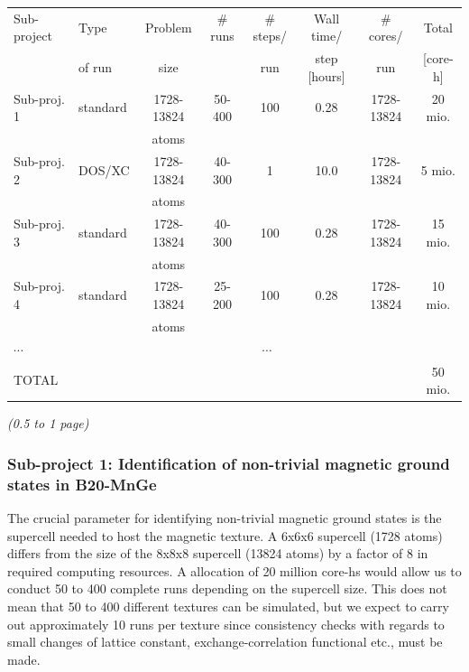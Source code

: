 \documentclass [a4paper, 12pt]{article}
\begin{document}
\begin{tabular}{llcccccc} \hline\hline
  Sub-project & 
  Type &
  Problem & 
  \# runs & 
  \# steps/ & 
  Wall time/ & 
  \# cores/ & 
  Total \\
  &
  of run &
  size  &
  &
  run &
  step [hours] &
  run &
  [core-h] \\
 \hline\hline
  Sub-proj. 1 & 
  standard &
  1728-13824 & 
  50-400 & 
  100 &
  0.28 &
  1728-13824 &
  20 mio. \\
     &
     &
    atoms & 
     & 
     &
     &
     &
     \\
  Sub-proj. 2 & 
  DOS/XC &
  1728-13824 & 
  40-300 & 
  1 &
  10.0 &
  1728-13824 &
  5 mio. \\
     &
     &
    atoms & 
     & 
     &
     &
     &
     \\
  Sub-proj. 3 & 
  standard &
  1728-13824 & 
  40-300 & 
  100 &
  0.28 &
  1728-13824 &
  15 mio. \\
     &
     &
    atoms & 
     & 
     &
     &
     &
     \\
  Sub-proj. 4 & 
  standard &
  1728-13824 & 
  25-200 & 
  100 &
  0.28 &
  1728-13824 &
  10 mio. \\
     &
     &
    atoms & 
     & 
     &
     &
     &
     \\



$\cdots$ &\multicolumn{7}{c}{$\cdots$}\\
\hline\hline
TOTAL & & & & & & & 50 mio. \\
\end{tabular}
\bigskip

\textit{(0.5 to 1 page)}

\subsubsection{Sub-project 1: Identification of non-trivial magnetic ground states in B20-MnGe}
The crucial parameter for identifying non-trivial magnetic ground states is the
supercell needed to host the magnetic texture.
A 6x6x6 supercell (1728 atoms) differs from the size of the 8x8x8 supercell (13824 atoms)
by a factor of 8 in required computing resources. A allocation of 20 million core-hs would allow
us to conduct 50 to 400 complete runs depending on the supercell size.
This does not mean that 50 to 400 different textures can be simulated, but
we expect to carry out approximately 10 runs per texture since consistency checks with regards to 
small changes of lattice constant, exchange-correlation functional etc., must be made.
\end{document}

